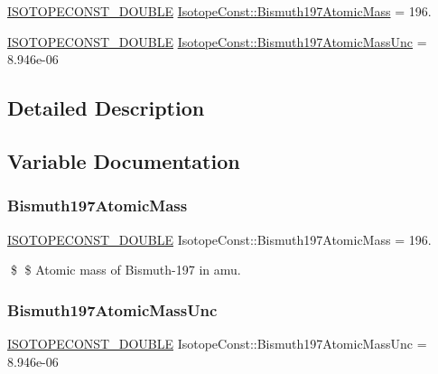 \begin{DoxyCompactItemize}
\item 
\mbox{\hyperlink{group___isotope_const-_macros_ga8f45a7272ce02c0b4c65c44636ed719a}{I\+S\+O\+T\+O\+P\+E\+C\+O\+N\+S\+T\+\_\+\+D\+O\+U\+B\+LE}} \mbox{\hyperlink{group___isotope_const-_bismuth-_bi197_gaea9f11709e8971c6cd96a595ae50c68e}{Isotope\+Const\+::\+Bismuth197\+Atomic\+Mass}} = 196.
\item 
\mbox{\hyperlink{group___isotope_const-_macros_ga8f45a7272ce02c0b4c65c44636ed719a}{I\+S\+O\+T\+O\+P\+E\+C\+O\+N\+S\+T\+\_\+\+D\+O\+U\+B\+LE}} \mbox{\hyperlink{group___isotope_const-_bismuth-_bi197_ga0c9c66f6d93d159f3abaa36beda65c14}{Isotope\+Const\+::\+Bismuth197\+Atomic\+Mass\+Unc}} = 8.\+946e-\/06
\end{DoxyCompactItemize}


\subsection{Detailed Description}


\subsection{Variable Documentation}
\mbox{\label{group___isotope_const-_bismuth-_bi197_gaea9f11709e8971c6cd96a595ae50c68e}} 
\subsubsection{\texorpdfstring{Bismuth197\+Atomic\+Mass}{Bismuth197AtomicMass}}
{\footnotesize\ttfamily \mbox{\hyperlink{group___isotope_const-_macros_ga8f45a7272ce02c0b4c65c44636ed719a}{I\+S\+O\+T\+O\+P\+E\+C\+O\+N\+S\+T\+\_\+\+D\+O\+U\+B\+LE}} Isotope\+Const\+::\+Bismuth197\+Atomic\+Mass = 196.}

\$ \$ Atomic mass of Bismuth-\/197 in amu. \mbox{\label{group___isotope_const-_bismuth-_bi197_ga0c9c66f6d93d159f3abaa36beda65c14}} 
\subsubsection{\texorpdfstring{Bismuth197\+Atomic\+Mass\+Unc}{Bismuth197AtomicMassUnc}}
{\footnotesize\ttfamily \mbox{\hyperlink{group___isotope_const-_macros_ga8f45a7272ce02c0b4c65c44636ed719a}{I\+S\+O\+T\+O\+P\+E\+C\+O\+N\+S\+T\+\_\+\+D\+O\+U\+B\+LE}} Isotope\+Const\+::\+Bismuth197\+Atomic\+Mass\+Unc = 8.\+946e-\/06}

